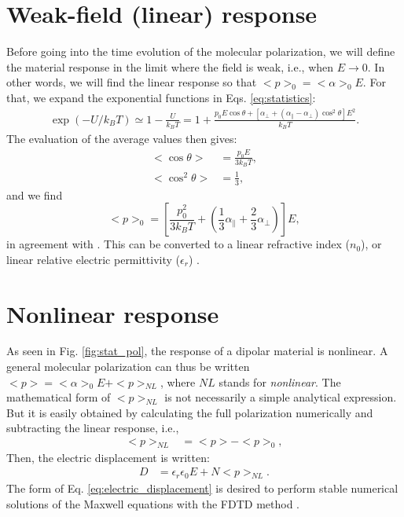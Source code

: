 \documentclass[12pt,letterpaper]{article}
\begin{document}
\section{Weak-field (linear) response}\label{weak_field}
Before going into the time evolution of the molecular polarization, we will define the material response in the limit where the field is weak, i.e., when $E\rightarrow 0$. In other words, we will find the linear response so that $<p>_0=<\alpha>_0 E$. For that, we expand the exponential functions in Eqs. \eqref{eq:statistics}:
\begin{align}\label{eq:exponential_first_order}
  \exp(-U/k_BT)\simeq 1-\frac{U}{k_BT} = 1+\frac{p_0E\cos\theta+\left[\alpha_\bot + (\alpha_\parallel - \alpha_\bot)\cos^2\theta\right]E^2}{k_BT}.
\end{align}
The evaluation of the average values then gives:
\begin{subequations}\label{eq:statistics_weak_field}
 \begin{align}
  <\cos\theta>&=\frac{p_0 E}{3k_BT},\\
  <\cos^2\theta>&=\frac{1}{3},
 \end{align}
\end{subequations}
and we find
\begin{equation}\label{eq:total_pol_weak_field}
 <p>_0=\left[\frac{p_0^2 }{3k_BT}+\left(\frac{1}{3}\alpha_\parallel + \frac{2}{3}\alpha_\bot\right)\right] E,
\end{equation}
in agreement with \cite{jackson1999,hook1991,boyd2008}. This can be converted to a linear refractive index ($n_0$), or linear relative electric permittivity ($\epsilon_r$) \cite{boyd2008}.

\section{Nonlinear response}\label{non_linear}
As seen in Fig. \ref{fig:stat_pol}, the response of a dipolar material is nonlinear. A general molecular polarization can thus be written $<p>=<\alpha>_0E + <p>_{NL}$, where $NL$ stands for \textit{nonlinear}. The mathematical form of $<p>_{NL}$ is not necessarily a simple analytical expression. But it is easily obtained by calculating the full polarization numerically and subtracting the linear response, i.e., 
\begin{align}\label{eq:non_linear_pol}
 <p>_{NL} &= <p> - <p>_0,
\end{align}
Then, the electric displacement is written:
\begin{align}\label{eq:electric_displacement}
 D &= \epsilon_r\epsilon_0 E + N<p>_{NL}.
\end{align}
The form of Eq. \eqref{eq:electric_displacement} is desired to perform stable numerical solutions of the Maxwell equations with the FDTD method \cite{sullivan2000,taflove2005}.
\end{document}
